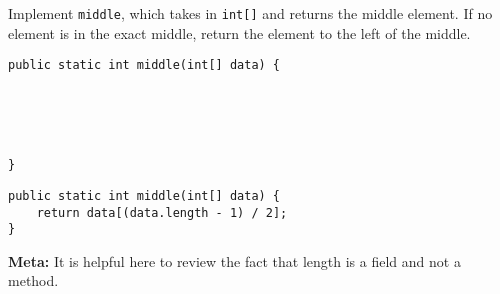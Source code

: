 \begin{blocksection}
\question Implement \lstinline$middle$, which takes in \lstinline$int[]$ and
returns the middle element. If no element is in the exact middle, return the
element to the left of the middle.

\ifprintanswers\else
\begin{lstlisting}
public static int middle(int[] data) {





}
\end{lstlisting}
\fi

\begin{solution}
\begin{lstlisting}
public static int middle(int[] data) {
    return data[(data.length - 1) / 2];
}
\end{lstlisting}
\textbf{Meta:} It is helpful here to review the fact that length is a field and not a method. 
\end{solution}
\end{blocksection}
